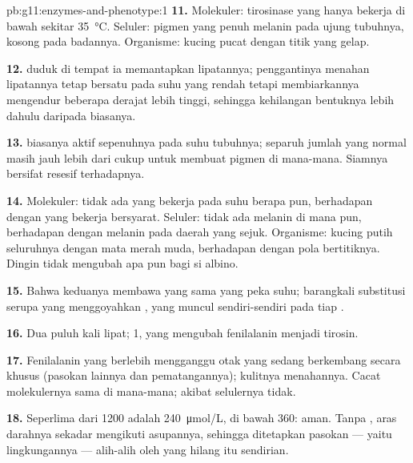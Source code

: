 \begin{solution}{pb:g11:enzymes-and-phenotype:1}
\textbf{11.} Molekuler: tirosinase yang hanya bekerja di bawah sekitar
\qty{35}{\celsius}. Seluler:  pigmen yang penuh melanin pada ujung
tubuhnya, kosong pada badannya. Organisme: kucing pucat dengan titik
yang gelap.

\textbf{12.}  duduk di tempat ia memantapkan lipatannya;
penggantinya menahan lipatannya tetap bersatu pada suhu yang rendah
tetapi membiarkannya mengendur beberapa derajat lebih tinggi, sehingga
 kehilangan bentuknya lebih dahulu daripada  biasanya.

\textbf{13.}   biasanya aktif sepenuhnya pada suhu tubuhnya;
separuh jumlah yang normal masih jauh lebih dari cukup untuk membuat
pigmen di mana-mana.  Siamnya bersifat resesif terhadapnya.

\textbf{14.} Molekuler: tidak ada  yang bekerja pada suhu berapa
pun, berhadapan dengan  yang bekerja bersyarat. Seluler: tidak ada
melanin di mana pun, berhadapan dengan melanin pada daerah yang sejuk.
Organisme: kucing putih seluruhnya dengan mata merah muda, berhadapan
dengan pola bertitiknya. Dingin tidak mengubah apa pun bagi si albino.

\textbf{15.} Bahwa keduanya membawa   yang sama yang peka suhu;
barangkali substitusi serupa yang menggoyahkan , yang muncul
sendiri-sendiri pada tiap .

\textbf{16.} Dua puluh kali lipat;  1, yang mengubah fenilalanin
menjadi tirosin.

\textbf{17.} Fenilalanin yang berlebih mengganggu  otak yang sedang
berkembang secara khusus (pasokan  lainnya dan pematangannya);
 kulitnya menahannya. Cacat molekulernya sama di mana-mana; akibat
selulernya tidak.

\textbf{18.} Seperlima dari \num{1200} adalah \qty{240}{\micro mol/L},
di bawah \num{360}: aman. Tanpa , aras darahnya sekadar
mengikuti asupannya, sehingga  ditetapkan pasokan
 --- yaitu lingkungannya --- alih-alih oleh  yang
hilang itu sendirian.


\end{solution}
